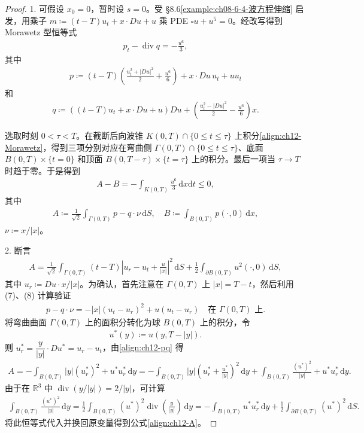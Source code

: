 \documentclass[../../main.tex]{subfiles}
\begin{document}
\begin{proof}
1. 可假设 $x_0=0$，暂时设 $s=0$。受 \S8.6\cref{example:ch08-6-4-波方程伸缩} 启发，用乘子 $m\coloneqq(t-T)u_t+x\cdot Du+u$ 乘 PDE $\square u+u^5=0$。经改写得到 Morawetz 型恒等式
\begin{align}
p_t-\operatorname{div}q=-\frac{u^6}{3},
\label{align:ch12-Morawetz}
\end{align}
其中
\begin{align*}
p\coloneqq(t-T)\left(\frac{u_t^2+|Du|^2}{2}+\frac{u^6}{6}\right)+x\cdot Du\,u_t+uu_t
\end{align*}
和
\begin{align*}
q\coloneqq((t-T)u_t+x\cdot Du+u)Du+\left(\frac{u_t^2-|Du|^2}{2}-\frac{u^6}{6}\right)x.
\end{align*}

选取时刻 $0<\tau<T$。在截断后向波锥 $K(0,T)\cap\{0\leqslant t\leqslant\tau\}$ 上积分\eqref{align:ch12-Morawetz}，得到三项分别对应在弯曲侧 $\Gamma(0,T)\cap\{0\leqslant t\leqslant\tau\}$、底面 $B(0,T)\times\{t=0\}$ 和顶面 $B(0,T-\tau)\times\{t=\tau\}$ 上的积分。最后一项当 $\tau\to T$ 时趋于零。于是得到
\begin{align}
A-B=-\int_{K(0,T)}\frac{u^6}{3}\,\mathrm{d}x\mathrm{d}t\leqslant 0,
\label{align:ch12-AB}
\end{align}
其中
\begin{align*}
A\coloneqq\frac{1}{\sqrt{2}}\int_{\Gamma(0,T)}p-q\cdot\nu\,\mathrm{d}S,\quad B\coloneqq\int_{B(0,T)}p(\cdot,0)\,\mathrm{d}x,
\end{align*}
$\nu\coloneqq x/|x|$。

2. 断言
\begin{align}
A=\frac{1}{\sqrt{2}}\int_{\Gamma(0,T)}(t-T)\left|u_r-u_t+\frac{u}{|x|}\right|^2\,\mathrm{d}S+\frac{1}{2}\int_{\partial B(0,T)}u^2(\cdot,0)\,\mathrm{d}S,
\label{align:ch12-A}
\end{align}
其中 $u_r\coloneqq Du\cdot x/|x|$。为确认，首先注意在 $\Gamma(0,T)$ 上 $|x|=T-t$，然后利用 (7)、(8) 计算验证
\begin{align}
p-q\cdot\nu=-|x|(u_t-u_r)^2+u(u_t-u_r) \quad \text{在 } \Gamma(0,T) \text{ 上}.
\label{align:ch12-pq}
\end{align}
将弯曲曲面 $\Gamma(0,T)$ 上的面积分转化为球 $B(0,T)$ 上的积分，令
\begin{align*}
u^*(y)\coloneqq u(y,T-|y|).
\end{align*}
则 $u_r^*=\dfrac{y}{|y|}\cdot Du^*=u_r-u_t$，由\eqref{align:ch12-pq} 得
\begin{align*}
A=-\int_{B(0,T)}|y|(u_r^*)^2+u^*u_r^*\,\mathrm{d}y=-\int_{B(0,T)}|y|\left(u_r^*+\frac{u^*}{|y|}\right)^2\,\mathrm{d}y+\int_{B(0,T)}\frac{(u^*)^2}{|y|}+u^*u_r^*\,\mathrm{d}y.
\end{align*}
由于在 $\mathbb{R}^3$ 中 $\operatorname{div}(y/|y|)=2/|y|$，可计算
\begin{align*}
\int_{B(0,T)}\frac{(u^*)^2}{|y|}\,\mathrm{d}y=\frac{1}{2}\int_{B(0,T)}(u^*)^2\operatorname{div}\left(\frac{y}{|y|}\right)\,\mathrm{d}y=-\int_{B(0,T)}u^*u_r^*\,\mathrm{d}y+\frac{1}{2}\int_{\partial B(0,T)}(u^*)^2\,\mathrm{d}S.
\end{align*}
将此恒等式代入并换回原变量得到公式\eqref{align:ch12-A}。


\end{proof}
\end{document}
